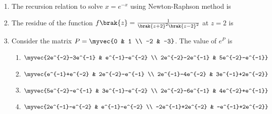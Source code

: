 \documentclass[a4paper, 11pt]{article}
\begin{document}
\begin{enumerate}
    \hfill{}

    \item The recursion relation to solve $x=e^{-x}$ using Newton-Raphson method is
    \begin{enumerate}
    \end{enumerate}

    \hfill{}

    \item The residue of the function $f\brak{z} = \frac{1}{\brak{z+2}^2\brak{z-2}^2}$ at $z=2$ is
    \begin{enumerate}
    \end{enumerate}
    
    \hfill{}

    \item Consider the matrix $P=\myvec{0 & 1 \\ -2 & -3}$. The value of $e^P$ is
    \begin{enumerate}
        \item $\myvec{2e^{-2}-3e^{-1} & e^{-1}-e^{-2} \\ 2e^{-2}-2e^{-1} & 5e^{-2}-e^{-1}}$
        \item $\myvec{e^{-1}+e^{-2} & 2e^{-2}-e^{-1} \\ 2e^{-1}-4e^{-2} & 3e^{-1}+2e^{-2}}$
        \item $\myvec{5e^{-2}-e^{-1} & 3e^{-1}-e^{-2} \\ 2e^{-2}-6e^{-1} & 4e^{-2}+e^{-1}}$
        \item $\myvec{2e^{-1}-e^{-2} & e^{-1}-e^{-2} \\ -2e^{-1}+2e^{-2} & -e^{-1}+2e^{-2}}$
    \end{enumerate}


\end{enumerate}
\end{document}
